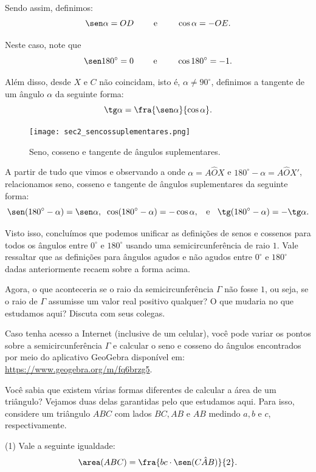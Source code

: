 Sendo assim, definimos:
$$\sen\alpha= OD \qquad \text{ e } \qquad \cos\alpha= -OE.$$

Neste caso, note que 
$$\sen 180^\circ = 0 \qquad \text{  e  } \qquad\cos 180^\circ = -1.$$

Além disso, desde $X$ e $C$ não coincidam, isto é, $\alpha\neq90^\circ$, definimos a tangente de um ângulo $\alpha$ da seguinte forma:
$$\tg\alpha = \fra{\sen\alpha}{\cos\alpha}.$$

\begin{figure}[H]
    \centering
    \texttt{[image: sec2\_sencossuplementares.png]}
    \caption{Seno, cosseno e tangente de ângulos suplementares.}
    \label{sec2_sencosasuplementares}
\end{figure}
A partir de tudo que vimos e observando a  onde $\alpha=A\hat{O}X$ e $180^\circ-\alpha=A\hat{O}X'$, relacionamos seno, cosseno e tangente de ângulos suplementares da seguinte forma:
$$\sen(180^\circ-\alpha)=\sen\alpha,\;\;  \cos(180^\circ-\alpha)=-\cos\alpha, \;\; \text{ e } \;\; \tg(180^\circ-\alpha)=-\tg\alpha.$$

Visto isso, concluímos que podemos unificar as definições de senos e cossenos para todos os ângulos entre $0^\circ$ e $180^\circ$ usando uma semicircunferência de raio $1$. Vale ressaltar que as definições para ângulos agudos e não agudos entre $0^\circ$ e $180^\circ$ dadas anteriormente recaem sobre a forma acima.

Agora, o que aconteceria se o raio da semicircunferência $\Gamma$ não fosse $1$, ou seja, se o raio de $\Gamma$ assumisse um valor real positivo qualquer? O que mudaria no que estudamos aqui? Discuta com seus colegas.

Caso tenha acesso a Internet (inclusive de um celular), você pode variar os pontos sobre a semicircunferência $\Gamma$ e calcular o seno e cosseno do ângulos encontrados por meio do aplicativo GeoGebra disponível em: \url{https://www.geogebra.org/m/fq6brzg5}.


Você sabia que existem várias formas diferentes de calcular a área de um triângulo? Vejamos duas delas garantidas pelo que estudamos aqui. Para isso, considere um triângulo $ABC$ com lados $BC,AB$ e $AB$ medindo $a, b$ e $c$, respectivamente. 

(1) Vale a seguinte igualdade: 
\begin{equation}
    \area(ABC)=\fra{bc\cdot\sen(C\hat{A}B)}{2}.\label{sec2_areatriag1}
\end{equation}

